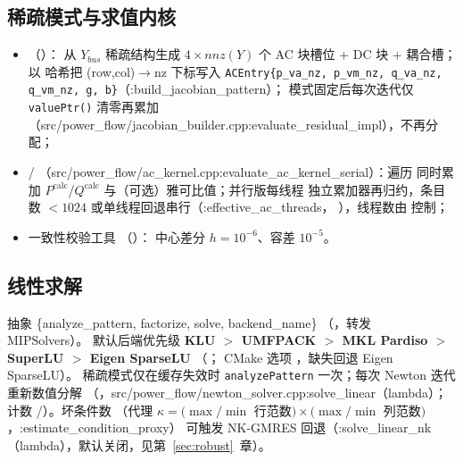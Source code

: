 \subsection{稀疏模式与求值内核}
\begin{itemize}
  \item {}（）：
        从 $Y_{bus}$ 稀疏结构生成 $4\times nnz(Y)$ 个 AC 块槽位 + DC 块 + 耦合槽；
        以  哈希把 (row,col)$\to$nz 下标写入
        \texttt{ACEntry\{p\_va\_nz, p\_vm\_nz, q\_va\_nz, q\_vm\_nz, g, b\}}（:build\_jacobian\_pattern）；
        模式固定后每次迭代仅 \texttt{valuePtr()} 清零再累加
        （src/power\_flow/jacobian\_builder.cpp:evaluate\_residual\_impl），不再分配；
  \item {}/
        （src/power\_flow/ac\_kernel.cpp:evaluate\_ac\_kernel\_serial）：遍历  同时累加
        $P^{\mathrm{calc}}$/$Q^{\mathrm{calc}}$ 与（可选）雅可比值；并行版每线程
        独立累加器再归约，条目数 $<1024$ 或单线程回退串行（:effective\_ac\_threads，
        ），线程数由  控制；
  \item 一致性校验工具 （）：
        中心差分 $h=10^{-6}$、容差 $10^{-5}$。
\end{itemize}

\subsection{线性求解}
抽象 \{analyze\_pattern, factorize, solve, backend\_name\}
（，转发 MIPSolvers）。
默认后端优先级 \textbf{KLU $>$ UMFPACK $>$ MKL Pardiso $>$ SuperLU $>$ Eigen SparseLU}
（；
CMake 选项 ，缺失回退 Eigen SparseLU）。
稀疏模式仅在缓存失效时 \texttt{analyzePattern} 一次；每次 Newton 迭代重新数值分解
（，src/power\_flow/newton\_solver.cpp:solve\_linear（lambda）；计数
/）。坏条件数
（代理 $\kappa=(\max/\min$ 行范数$)\times(\max/\min$ 列范数$)$，:estimate\_condition\_proxy）
可触发 NK-GMRES 回退（:solve\_linear\_nk（lambda），默认关闭，见第~\ref{sec:robust}~章）。

